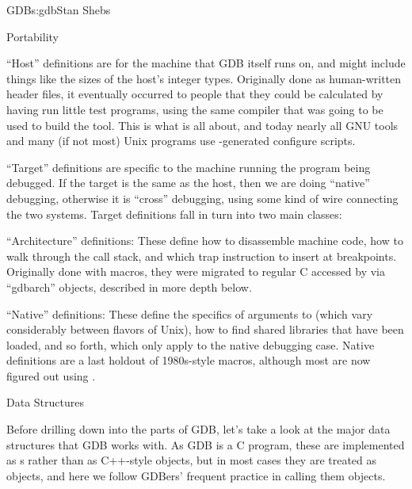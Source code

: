 \begin{aosachapter}{GDB}{s:gdb}{Stan Shebs}
\begin{aosasect1}{Portability}
\begin{aosaitemize}
\item ``Host'' definitions are for the machine that GDB itself runs on,
and might include things like the sizes of the host's integer types.
Originally done as human-written header files, it eventually occurred to
people that they could be calculated by having  run
little test programs, using the same compiler that was going to be
used to build the tool.  This is what
\cite{bib:autoconf} is all about, and today nearly all
GNU tools and many (if not most) Unix programs use
-generated configure scripts.

\item ``Target'' definitions are specific to the machine running the
program being debugged.  If the target is the same as the host, then
we are doing ``native'' debugging, otherwise it is ``cross''
debugging, using some kind of wire connecting the two systems.  Target
definitions fall in turn into two main classes:

\begin{aosaitemize}
\item ``Architecture'' definitions: These define how to disassemble machine code, how
to walk through the call stack, and which trap instruction to insert at
breakpoints.  Originally done with macros, they were migrated to
regular C accessed by via ``gdbarch'' objects, described in more depth
below.

\item ``Native'' definitions: These define the specifics of arguments to
 (which vary considerably between flavors of Unix), how
to find shared libraries that have been loaded, and so forth, which
only apply to the native debugging case.  Native definitions are a
last holdout of 1980s-style macros, although most are now figured out
using .
\end{aosaitemize}
\end{aosaitemize}

\end{aosasect1}

\begin{aosasect1}{Data Structures}

Before drilling down into the parts of GDB, let's take a look at the
major data structures that GDB works with.  As GDB is a C program,
these are implemented as s rather than as C++-style
objects, but in most cases they are treated as objects, and here we
follow GDBers' frequent practice in calling them objects.


\end{aosasect1}
\end{aosachapter}
